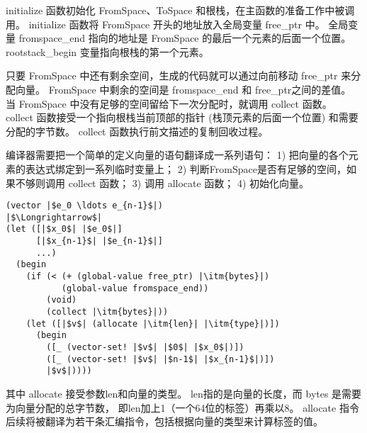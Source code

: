 initialize 函数初始化 FromSpace、ToSpace 和根栈，在主函数的准备工作中被调用。
initialize 函数将 FromSpace 开头的地址放入全局变量 free\_ptr 中。
全局变量 fromspace\_end 指向的地址是 FromSpace 的最后一个元素的后面一个位置。
rootstack\_begin 变量指向根栈的第一个元素。

只要 FromSpace 中还有剩余空间，生成的代码就可以通过向前移动 free\_ptr 来分配向量。
FromSpace 中剩余的空间是 fromspace\_end 和 free\_ptr之间的差值。
当 FromSpace 中没有足够的空间留给下一次分配时，就调用 collect 函数。
collect 函数接受一个指向根栈当前顶部的指针 (栈顶元素的后面一个位置) 和需要分配的字节数。
collect 函数执行前文描述的复制回收过程。

编译器需要把一个简单的定义向量的语句翻译成一系列语句：
1) 把向量的各个元素的表达式绑定到一系列临时变量上；
2) 判断FromSpace是否有足够的空间，如果不够则调用 collect 函数；
3) 调用 allocate 函数；
4) 初始化向量。

\begin{lstlisting}
(vector |$e_0 \ldots e_{n-1}$|)
|$\Longrightarrow$|
(let ([|$x_0$| |$e_0$|]
      [|$x_{n-1}$| |$e_{n-1}$|]
      ...)
  (begin
    (if (< (+ (global-value free_ptr) |\itm{bytes}|)
           (global-value fromspace_end))
        (void)
        (collect |\itm{bytes}|))
    (let ([|$v$| (allocate |\itm{len}| |\itm{type}|)])
      (begin
        ([_ (vector-set! |$v$| |$0$| |$x_0$|)])
        ([_ (vector-set! |$v$| |$n-1$| |$x_{n-1}$|)])
        |$v$|))))
\end{lstlisting}

其中 allocate 接受参数len和向量的类型。
len指的是向量的长度，而 bytes 是需要为向量分配的总字节数，
即len加上1（一个64位的标签）再乘以8。
allocate 指令后续将被翻译为若干条汇编指令，包括根据向量的类型来计算标签的值。
